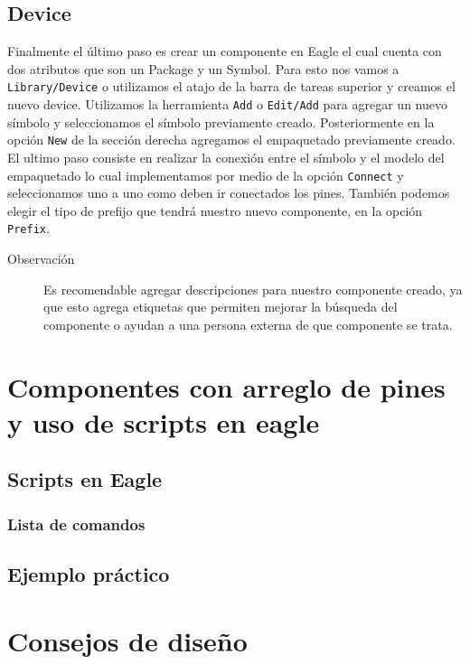 \documentclass[11pt,letterpaper,spanish]{article}
\begin{document}
\subsection{Device}
Finalmente el último paso es crear un componente en Eagle el cual cuenta con dos atributos que son un Package y un Symbol. Para esto nos vamos a \verb+Library/Device+ o utilizamos el atajo de la barra de tareas superior y creamos el nuevo device. 
 Utilizamos la herramienta \verb+Add+ o \verb+Edit/Add+ para agregar un nuevo símbolo y seleccionamos el símbolo previamente creado. Posteriormente en la opción \verb+New+ de la sección derecha agregamos el empaquetado previamente creado. El ultimo paso consiste en realizar la conexión entre el símbolo y el modelo del empaquetado lo cual implementamos por medio de la opción \verb+Connect+ y seleccionamos uno a uno como deben ir conectados los pines. También podemos elegir el tipo de prefijo que tendrá nuestro nuevo componente, en la opción \verb+Prefix+.
\begin{description}
\item[Observación] Es recomendable agregar descripciones para nuestro componente creado, ya que esto agrega etiquetas que permiten mejorar la búsqueda del componente o ayudan a una persona externa de que componente se trata.
\end{description} 
 
\section{Componentes con arreglo de pines y uso de scripts en eagle}
	\subsection{Scripts en Eagle}
		\subsubsection{Lista de comandos}
	\subsection{Ejemplo práctico}
\section{Consejos de diseño} 
\end{document}
